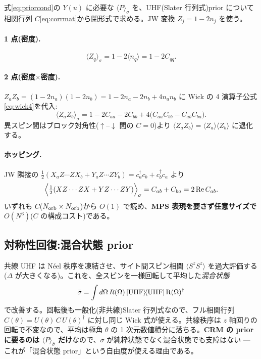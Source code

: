 \documentclass[11pt,a4paper]{ltjsarticle}
\newcommand{\bra}[1]{\langle #1|}
\newcommand{\ket}[1]{|#1\rangle}
\newcommand{\ev}[1]{\langle #1\rangle}
\newcommand{\cd}{c^\dagger}
\newcommand{\up}{\uparrow}
\newcommand{\dn}{\downarrow}
\begin{document}
式\eqref{eq:priorcond}の $Y(u)$ に必要な $\ev{P}_\sigma$ を、UHF(Slater 行列式)prior について相関行列 $C$\eqref{eq:corrmat}から閉形式で求める。JW 変換 $Z_j=1-2n_j$ を使う。

\paragraph{1 点(密度).}
\begin{equation}
  \ev{Z_q}_\sigma = 1-2\ev{n_q} = 1-2C_{qq}.
\end{equation}
\paragraph{2 点(密度$\times$密度).}$Z_aZ_b=(1-2n_a)(1-2n_b)=1-2n_a-2n_b+4n_an_b$ に Wick の 4 演算子公式\eqref{eq:wick4}を代入:
\begin{equation}
  \ev{Z_aZ_b}_\sigma = 1-2C_{aa}-2C_{bb}+4\bigl(C_{aa}C_{bb}-C_{ab}C_{ba}\bigr).
\end{equation}
異スピン間はブロック対角性($\up$--$\dn$ 間の $C=0$)より $\ev{Z_aZ_b}=\ev{Z_a}\ev{Z_b}$ に退化する。
\paragraph{ホッピング.}JW 隣接の $\tfrac12(X_aZ\cdots ZX_b+Y_aZ\cdots ZY_b)=\cd_ac_b+\cd_bc_a$ より
\begin{equation}
  \Bigl\langle\tfrac12(XZ\cdots ZX+YZ\cdots ZY)\Bigr\rangle_\sigma = C_{ab}+C_{ba}=2\,\mathrm{Re}\,C_{ab}.
\end{equation}
いずれも $C$($N_{\rm orb}\times N_{\rm orb}$)から $O(1)$ で読め、\textbf{MPS 表現を要さず任意サイズで $O(N^3)$}($C$ の構成コスト)である。

\subsection{対称性回復:混合状態 prior}
共線 UHF は Néel 秩序を凍結させ、サイト間スピン相関 $\ev{S^zS^z}$ を過大評価する($\Delta$ が大きくなる)。これを、全スピンを一様回転して平均した\emph{混合状態}
\begin{equation}
  \bar\sigma=\int d\Omega\,R(\Omega)\,\ket{\rm UHF}\!\bra{\rm UHF}\,R(\Omega)^\dagger
\end{equation}
で改善する。回転後も一般化(非共線)Slater 行列式なので、フル相関行列 $C(\theta)=U(\theta)\,C\,U(\theta)^\dagger$ に対し同じ Wick 式が使える。共線秩序は $z$ 軸回りの回転で不変なので、平均は極角 $\theta$ の 1 次元数値積分に落ちる。\textbf{CRM の prior に要るのは $\ev{P}_{\bar\sigma}$ だけ}なので、$\bar\sigma$ が純粋状態でなく混合状態でも支障はない — これが「混合状態 prior」という自由度が使える理由である。
\end{document}
